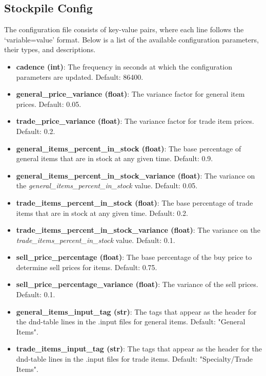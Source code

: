 \subsection{Stockpile Config\label{stockpile config}}

The configuration file consists of key-value pairs, where each line follows the `variable=value' format. Below is a list of the available configuration parameters, their types, and descriptions.

\begin{itemize}
    \item \textbf{cadence (int)}: The frequency in seconds at which the configuration parameters are updated. Default: 86400.
    \item \textbf{general\_price\_variance (float)}: The variance factor for general item prices. Default: 0.05.
    \item \textbf{trade\_price\_variance (float)}: The variance factor for trade item prices. Default: 0.2.
    \item \textbf{general\_items\_percent\_in\_stock (float)}: The base percentage of general items that are in stock at any given time. Default: 0.9.
    \item \textbf{general\_items\_percent\_in\_stock\_variance (float)}: The variance on the \textit{general\_items\_percent\_in\_stock} value. Default: 0.05.
    \item \textbf{trade\_items\_percent\_in\_stock (float)}: The base percentage of trade items that are in stock at any given time. Default: 0.2.
    \item \textbf{trade\_items\_percent\_in\_stock\_variance (float)}: The variance on the \textit{trade\_items\_percent\_in\_stock} value. Default: 0.1.
    \item \textbf{sell\_price\_percentage (float)}: The base percentage of the buy price to determine sell prices for items. Default: 0.75.
    \item \textbf{sell\_price\_percentage\_variance (float)}: The variance of the sell prices. Default: 0.1.
    \item \textbf{general\_items\_input\_tag (str)}: The tags that appear as the header for the dnd-table lines in the .input files for general items. Default: "General Items".
    \item \textbf{trade\_items\_input\_tag (str)}: The tags that appear as the header for the dnd-table lines in the .input files for trade items. Default: "Specialty/Trade Items".
\end{itemize}


